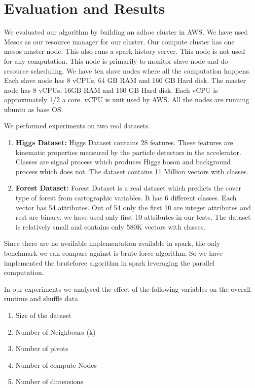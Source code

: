 \chapter{Evaluation and Results} \label{chap:Evaluation and Results}

We evaluated our algorithm by building an adhoc cluster in AWS. We
have used Mesos as our resource manager for our cluster. Our compute
cluster has one mesos master node. This also runs a spark history
server. This node is not used for any computation. This node is
primarily to monitor slave node and do resource scheduling. We have ten slave
nodes where all the computation happens. Each slave node has
8 vCPUs, 64 GB RAM and 160 GB Hard disk. The master node has 8 vCPUs,
16GB RAM and 160 GB Hard disk. Each vCPU is approximately 1/2 a
core. vCPU is unit used by AWS. All the nodes are running ubuntu as
base OS.

We performed experiments on two real datasets.
\begin{enumerate}
\item \textbf{Higgs Dataset:}
Higgs Dataset contains 28 features. These features are kinematic
properties measured by the particle detectors in the
accelerator. Classes are signal process which produces Higgs boson and
background process which does not. The dataset contains 11 Million
vectors with classes.

\item \textbf{Forest Dataset:}
Forest Dataset is a real dataset which predicts the cover type of
forest from cartographic variables. It has 6 different classes. Each
vector has 54 attributes. Out of 54 only the first 10 are integer
attributes and rest are binary. we have used only first 10 attributes
in our tests. The dataset is relatively small and contains only 580K
vectors with classes.
\end{enumerate}


Since there are no available implementation available in spark, the
only benchmark we can compare against is brute force algorithm. So we
have implemented the bruteforce algorithm in spark leveraging the
parallel computation.

In our experiments we analysed the effect of the following variables on the
overall runtime and shuffle data
\begin{enumerate}
\item Size of the dataset
\item Number of Neighbours (k)
\item Number of pivots
\item Number of compute Nodes
\item Number of dimensions
\end{enumerate}



